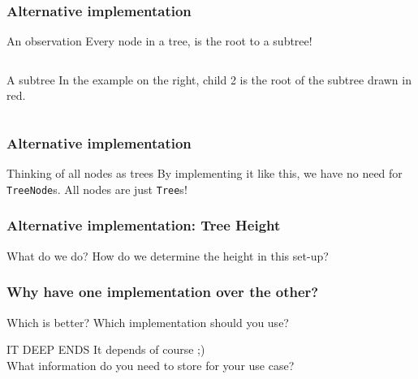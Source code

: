 \begin{frame}
	\frametitle{Alternative implementation}
		\begin{block}{An observation}
			Every node in a tree, is the root to a subtree!
		\end{block}	
		\pause
		\begin{columns}
				
			\pause
				\begin{exampleblock}{A subtree}
					In the example on the right, child 2 is the root of the subtree drawn in red.
				\end{exampleblock}	
		\end{columns}
\end{frame}

\begin{frame}
	\frametitle{Alternative implementation}
		\begin{block}{Thinking of all nodes as trees}
			By implementing it like this, we have no need for \texttt{TreeNode}s. All nodes are just \texttt{Tree}s!
		\end{block}	

		
\end{frame}

\begin{frame}
	\frametitle{Alternative implementation: Tree Height}
	\begin{questionblock}{What do we do?}
		How do we determine the height in this set-up?
	\end{questionblock}
	\pause
	
\end{frame}

\begin{frame}
	\frametitle{Why have one implementation over the other?}

	\begin{questionblock}{Which is better?}
		Which implementation should you use?
	\end{questionblock}
	\pause
	\begin{answerblock}{IT DEEP ENDS}
		It depends of course ;)\\
		What information do you need to store for your use case?
	\end{answerblock}
	
\end{frame}


